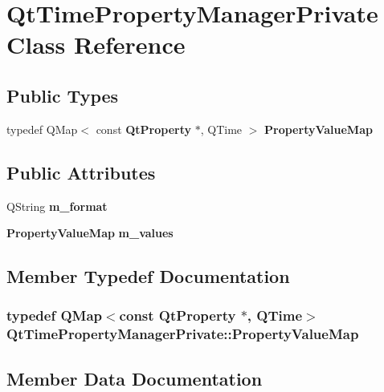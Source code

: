 \section{Qt\+Time\+Property\+Manager\+Private Class Reference}
\label{classQtTimePropertyManagerPrivate}
\subsection*{Public Types}
\begin{DoxyCompactItemize}
\item 
typedef Q\+Map$<$ const {\bf Qt\+Property} $\ast$, Q\+Time $>$ {\bf Property\+Value\+Map}
\end{DoxyCompactItemize}
\subsection*{Public Attributes}
\begin{DoxyCompactItemize}
\item 
Q\+String {\bf m\+\_\+format}
\item 
{\bf Property\+Value\+Map} {\bf m\+\_\+values}
\end{DoxyCompactItemize}


\subsection{Member Typedef Documentation}
\subsubsection[{Property\+Value\+Map}]{\setlength{\rightskip}{0pt plus 5cm}typedef Q\+Map$<$const {\bf Qt\+Property} $\ast$, Q\+Time$>$ {\bf Qt\+Time\+Property\+Manager\+Private\+::\+Property\+Value\+Map}}\label{classQtTimePropertyManagerPrivate_a1184578ee4bf9a90229b49042db44109}


\subsection{Member Data Documentation}
